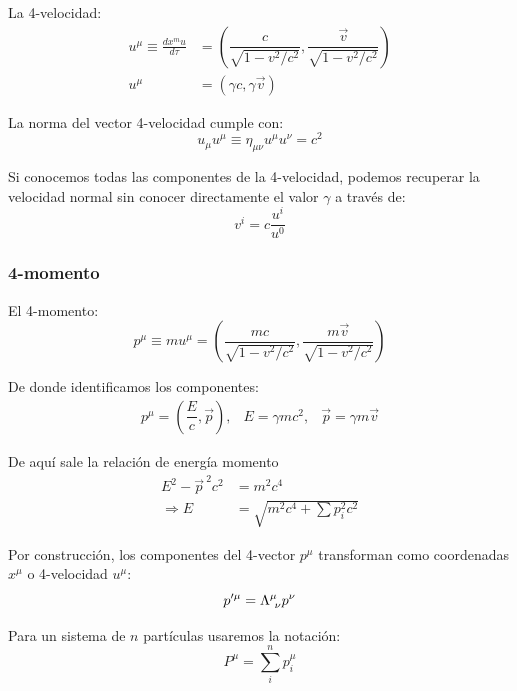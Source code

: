 \documentclass[]{report}
\numberwithin{equation}{section}
\newcommand{\LambdaMuNu}{\indUpDown}
\newcommand{\0}{\textcolor{gray}{0}}
\begin{document}
La 4-velocidad:
\begin{align}
	u^\mu \equiv \frac{dx^mu}{d\tau} &= \left(\dfrac{c}{\sqrt{1 - v^2/c^2}}, \dfrac{\vec{v}}{\sqrt{1 - v^2/c^2}} \right) \\
	u^\mu &= \left(\gamma c, \gamma\vec{v} \right)
\end{align}

La norma del vector 4-velocidad cumple con:
\begin{equation}
	u_\mu u^\mu \equiv \eta_{\mu\nu}u^\mu u^\nu = c^2
\end{equation}

Si conocemos todas las componentes de la 4-velocidad, podemos recuperar la velocidad normal sin conocer directamente el valor \(\gamma\) a través de:
\begin{equation}
	v^i = c\frac{u^i}{u^0}
\end{equation}

\subsubsection{4-momento}
\phantom{.}

El 4-momento:
\begin{equation}
	p^\mu \equiv mu^\mu = \left(\dfrac{mc}{\sqrt{1 - v^2/c^2}}, \dfrac{m\vec{v}}{\sqrt{1 - v^2/c^2}} \right) 
\end{equation}

De donde identificamos los componentes:
\begin{equation}
	\begin{matrix}
		p^\mu  = \left(\dfrac{E}{c}, \vec{p}\right), & E = \gamma mc^2, & \vec{p} = \gamma m\vec{v}
	\end{matrix}
\end{equation}

De aquí sale la relación de energía momento
\begin{align}
	E^2 - \vec{p}^{\ 2}c^2 &= m^2c^4 \label{eqn:relacion_energia_momento}\\
	\Rightarrow E &= \sqrt{m^2c^4 + \sum p_i^2c^2}
\end{align}

Por construcción, los componentes del 4-vector \(p^\mu\) transforman como coordenadas \(x^\mu\) o 4-velocidad \(u^\mu\):
\begin{equation}
	p'^\mu = \LambdaMuNu p^\nu
\end{equation}

Para un sistema de \(n\) partículas usaremos la notación:
\begin{equation}
	P^\mu = \sum_i^n p^\mu_i
\end{equation}
\end{document}
